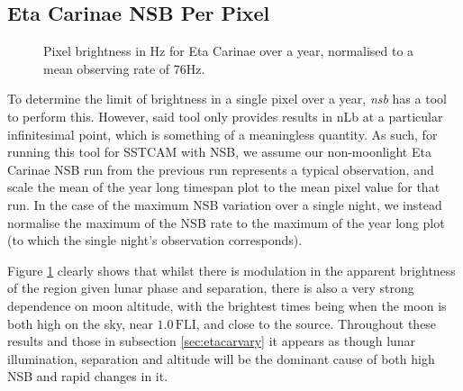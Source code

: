 \subsection{Eta Carinae NSB Per Pixel}
\label{sec:etacartimespan}
\begin{figure}[ht]
\begin{centering}
\caption{Pixel brightness in Hz for Eta Carinae over a year, normalised to a mean observing rate of 76Hz.}
\label{fig:etacar_timespan}
\end{centering}
\end{figure}

To determine the limit of brightness in a single pixel over a year, \textit{nsb} has a tool to perform this. However, said tool only provides results in nLb at a particular infinitesimal point, which is something of a meaningless quantity. As such, for running this tool for SSTCAM with NSB, we assume our non-moonlight Eta Carinae NSB run from the previous run represents a typical observation, and scale the mean of the year long timespan plot to the mean pixel value for that run. In the case of the maximum NSB variation over a single night, we instead normalise the maximum of the NSB rate to the maximum of the year long plot (to which the single night's observation corresponds).

Figure \ref{fig:etacar_timespan} clearly shows that whilst there is modulation in the apparent brightness of the region given lunar phase and separation, there is also a very strong dependence on moon altitude, with the brightest times being when the moon is both high on the sky, near $\mathrm{1.0\,FLI}$, and close to the source. Throughout these results and those in subsection \ref{sec:etacarvary} it appears as though lunar illumination, separation and altitude will be the dominant cause of both high NSB and rapid changes in it.

